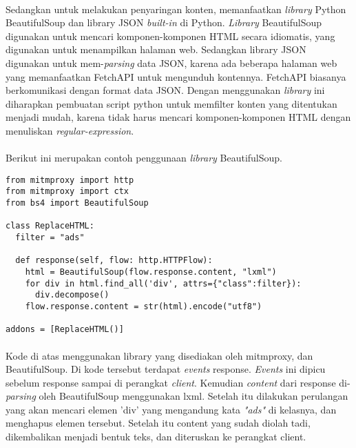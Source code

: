 \documentclass[./bab_3.tex]{subfiles}
\begin{document}
  \paragraph*{}Sedangkan untuk melakukan penyaringan konten,
  memanfaatkan \textit{library} Python BeautifulSoup dan
  library JSON \textit{built-in} di Python. \textit{Library}
  BeautifulSoup digunakan untuk mencari komponen-komponen
  HTML secara idiomatis, yang digunakan untuk menampilkan
  halaman web.
  Sedangkan library JSON digunakan untuk
  mem-\textit{parsing} data JSON, karena ada beberapa
  halaman web yang memanfaatkan FetchAPI untuk mengunduh
  kontennya. FetchAPI biasanya berkomunikasi dengan format
  data JSON. Dengan menggunakan \textit{library} ini
  diharapkan pembuatan script python untuk memfilter konten
  yang ditentukan menjadi mudah, karena tidak harus mencari
  komponen-komponen HTML dengan menuliskan
  \textit{regular-expression}.

  \paragraph*{} Berikut ini merupakan contoh penggunaan \textit{library} BeautifulSoup.

  \begin{verbatim}
from mitmproxy import http
from mitmproxy import ctx
from bs4 import BeautifulSoup

class ReplaceHTML:
  filter = "ads"

  def response(self, flow: http.HTTPFlow):
    html = BeautifulSoup(flow.response.content, "lxml")
    for div in html.find_all('div', attrs={"class":filter}):
      div.decompose()
    flow.response.content = str(html).encode("utf8")

addons = [ReplaceHTML()]
  \end{verbatim}

  \paragraph*{} Kode di atas menggunakan library yang
  disediakan oleh mitmproxy, dan BeautifulSoup. Di kode
  tersebut terdapat \textit{events} response.
  \textit{Events} ini dipicu sebelum response sampai di
  perangkat \textit{client}. Kemudian \textit{content} dari
  response di-\textit{parsing} oleh BeautifulSoup menggunakan
  lxml. Setelah itu dilakukan perulangan yang akan mencari
  elemen 'div' yang mengandung kata \textit{"ads"} di
  kelasnya, dan menghapus elemen tersebut. Setelah itu
  content yang sudah diolah tadi, dikembalikan menjadi
  bentuk teks, dan diteruskan ke perangkat client.
\end{document}
